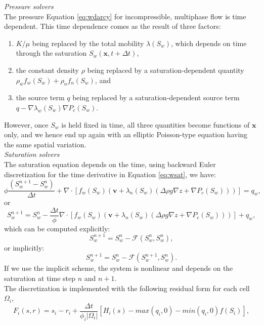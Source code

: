 \documentclass[a4paper,10pt]{report}
\begin{document}
\emph{Pressure solvers}\\
The pressure Equation \eqref{eq:wdarcy} for incompressible, multiphase flow is time dependent. This time dependence comes as the result of three factors:
\begin{enumerate}
 \item $K/\mu$ being replaced by the total mobility $\lambda(S_w )$, which depends on time through the saturation $S_w (\mathbf{x}, t + \Delta t)$,
 \item the constant density $\rho$ being replaced by a saturation-dependent quantity $\rho_w f_w (S_w ) + \rho_nf_n (S_w )$, and
 \item the source term $q$ being replaced by a saturation-dependent source term
$q − \nabla \lambda_w (S_w )\nabla P_c (S_w )$.
\end{enumerate}
However, once $S_w$ is held fixed in time, all three quantities become functions of $\mathbf{x}$ only, and we hence end up again with an elliptic Poisson-type equation having the same spatial variation. \\
\emph{Saturation solvers}\\
The saturation equation depends on the time, using backward Euler discretization for the time derivative in Equation \ref{eq:wsat}, we have:
\begin{equation}\label{eq:wsat1}
 \phi\frac{( {S}_{w}^{n+1}-{S}_{w}^n)}{\Delta t}+\nabla \cdot [f_w({S}_{w})( \mathbf{v}+\lambda_n({S}_{w})(\Delta  \rho g\nabla z+\nabla P_c({S}_{w})))]= q_w,
\end{equation}
or
\begin{equation*}\label{eq:wsat2}
 {S}_{w}^{n+1}={S}_{w}^n-\frac{\Delta t}{\phi}\nabla \cdot [f_w({S}_{w})( \mathbf{v}+\lambda_n({S}_{w})(\Delta  \rho g\nabla z+\nabla P_c({S}_{w})))]+q_w,
\end{equation*}
which can be computed explicitly:
\begin{equation*}\label{eq:wsat3}
 {S}_{w}^{n+1}={S}_{w}^n-\mathcal{F}({S}_{w}^{n},{S}_{w}^{n}),
\end{equation*}
or implicitly:
\begin{equation*}\label{eq:wsat4}
 {S}_{w}^{n+1}={S}_{w}^n-\mathcal{F}({S}_{w}^{n+1},{S}_{w}^{n}).
\end{equation*}
If we use the implicit scheme, the system is nonlinear and depends on the saturation at time step $n$ and $n+1$.\\
The discretization is implemented with the following residual form for each cell $\Omega_i$,
\begin{equation}\label{eq:resS}
 F_i (s, r) = s_i − r_i +\frac{\Delta t}{\phi_i|\Omega_i|}[H_i (s) − max(q_i, 0) − min(q_i , 0)f (S_i )],
\end{equation}
\end{document}
